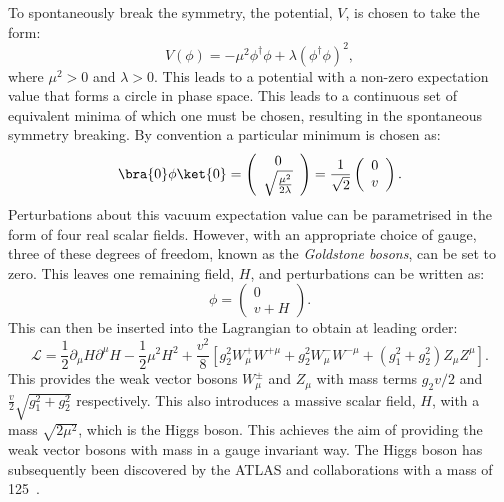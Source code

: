 To spontaneously break the symmetry, the potential, $V$, is chosen to
take the form:
\begin{equation}
\label{eq:higgsPot}
V(\phi)=-\mu^{2}\phi^{\dag}\phi+\lambda\left(\phi^{\dag}\phi\right)^{2},
\end{equation}
where $\mu^2>0$ and $\lambda>0$. This leads to a potential with a
non-zero expectation value that forms a circle in phase space. This
leads to a continuous set of equivalent minima of which one must be
chosen, resulting in the spontaneous symmetry breaking. By convention a
particular minimum is chosen as:
\begin{equation}
\bra{0}\phi\ket{0}=\left(\begin{array}{c} 0 \\ \sqrt{\frac{\mu^{2}}{2\lambda}} \end{array}\right)=\frac{1}{\sqrt{2}}\left(\begin{array}{c} 0 \\ v \end{array}\right).
\end{equation}
Perturbations about this vacuum expectation value can be parametrised
in the form of four real scalar fields. However, with an appropriate
choice of gauge, three of these degrees of freedom, known as the
\emph{Goldstone bosons}, can be set to zero. This leaves one remaining
field, $H$, and perturbations can be written as:
\begin{equation}
  \phi=\left(\begin{array}{c}0 \\ v+H \end{array}\right).
\end{equation}
This can then be inserted into the Lagrangian to obtain at leading
order:
\begin{equation}
  \mathcal{L}=\frac{1}{2}\partial_{\mu}H\partial^{\mu}H-\frac{1}{2}\mu^{2}H^{2}+\frac{v^{2}}{8}\left[g_{2}^{2}W_{\mu}^{+}W^{+\mu}+g_{2}^{2}W_{\mu}^{-}W^{-\mu}+\left(g_{1}^{2}+g_{2}^{2}\right)Z_{\mu}Z^{\mu}\right].
\end{equation}
This provides the weak vector bosons $W_{\mu}^{\pm}$ and $Z_{\mu}$
with mass terms $g_2v/2$ and $\frac{v}{2}\sqrt{g_1^2+g_2^2}$
respectively. This also introduces a massive scalar field, $H$, with a
mass $\sqrt{2\mu^2}$, which is the Higgs boson. This achieves the aim of providing
the weak vector bosons with mass in a gauge invariant way. The
Higgs boson has subsequently been discovered by the ATLAS and \CMS
collaborations with a mass of 125~\gev \cite{1207.7214,1207.7235}.

